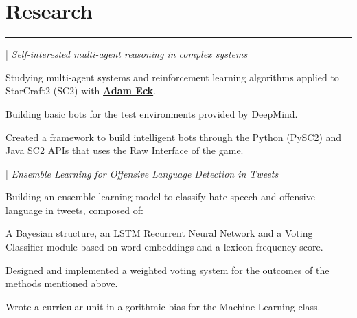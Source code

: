 \documentclass[]{dafirebanks-resume-openfont}
\begin{document}
\begin{minipage}[t]{0.66\textwidth}

\section{Research}
\vspace{-3pt}
{\color{blue}\hrule} \vspace{5pt}
 
 | \textit{Self-interested multi-agent reasoning in complex systems}\\
\begin{tightemize}
	\item Studying multi-agent systems and reinforcement learning algorithms applied to StarCraft2 (SC2) with \textbf{\href{http://www.cs.oberlin.edu/~aeck/}{Adam Eck}}.  
	\item Building basic bots for the test environments provided by DeepMind.
	\item Created a framework to build intelligent bots through the Python (PySC2) and Java SC2 APIs that uses the Raw Interface of the game. 
\end{tightemize}
\sectionsep

 | \textit{Ensemble Learning for Offensive Language Detection in Tweets}
\begin{tightemize}
	\item Building an ensemble learning model to classify hate-speech and offensive language in tweets, composed of:
	\vspace{\topsep}
	\begin{tightemize}
		\item A Bayesian structure, an LSTM Recurrent Neural Network and a Voting Classifier module based on word embeddings and a lexicon frequency score. 
	\end{tightemize}\vspace{\topsep}
	\item Designed and implemented a weighted voting system for the outcomes of the methods mentioned above.
	\item Wrote a curricular unit in algorithmic bias for the Machine Learning class.
\end{tightemize}
\sectionsep





\end{minipage}
\end{document}
